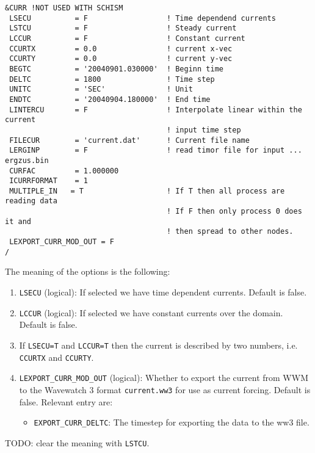 \documentclass[12pt]{amsart}
\begin{document}
\begin{verbatim}
&CURR !NOT USED WITH SCHISM
 LSECU          = F                  ! Time dependend currents
 LSTCU          = F                  ! Steady current
 LCCUR          = F                  ! Constant current
 CCURTX         = 0.0                ! current x-vec
 CCURTY         = 0.0                ! current y-vec
 BEGTC          = '20040901.030000'  ! Beginn time
 DELTC          = 1800               ! Time step
 UNITC          = 'SEC'              ! Unit
 ENDTC          = '20040904.180000'  ! End time
 LINTERCU       = F                  ! Interpolate linear within the current
                                     ! input time step
 FILECUR        = 'current.dat'      ! Current file name
 LERGINP        = F                  ! read timor file for input ... ergzus.bin
 CURFAC         = 1.000000
 ICURRFORMAT    = 1
 MULTIPLE_IN   = T                   ! If T then all process are reading data
                                     ! If F then only process 0 does it and
                                     ! then spread to other nodes.
 LEXPORT_CURR_MOD_OUT = F
/
\end{verbatim}
The meaning of the options is the following:
\begin{enumerate}
\item {\tt LSECU} (logical): If selected we have time dependent currents. Default is false.
\item {\tt LCCUR} (logical): If selected we have constant currents over the domain. Default is false.
\item If {\tt LSECU=T} and {\tt LCCUR=T} then the current is described by two numbers, i.e. {\tt CCURTX} and {\tt CCURTY}.
\item {\tt LEXPORT\_CURR\_MOD\_OUT} (logical): Whether to export the current from WWM to the Wavewatch 3 format {\tt current.ww3} for use as current forcing. Default is false. Relevant entry are:
  \begin{itemize}
  \item {\tt EXPORT\_CURR\_DELTC}: The timestep for exporting the data to the ww3 file.
  \end{itemize}
\end{enumerate}
TODO: clear the meaning with {\tt LSTCU}.


\newpage
\end{document}
